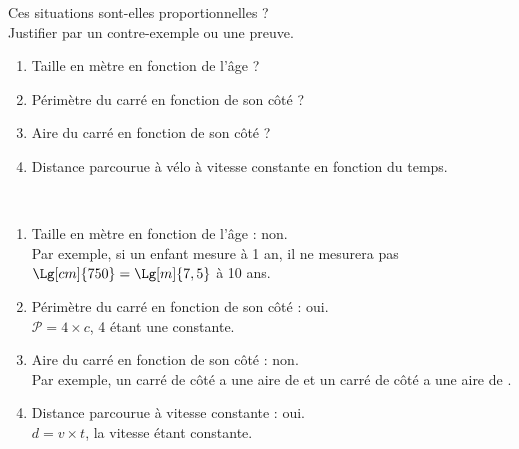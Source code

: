 \begin{exercice*} %
   Ces situations sont-elles proportionnelles ? \\
   Justifier par un contre-exemple ou une preuve.
   \begin{enumerate}
      \item Taille en mètre en fonction de l'âge ?
      \item Périmètre du carré en fonction de son côté ?
      \item Aire du carré en fonction de son côté ?
      \item Distance parcourue à vélo à vitesse constante en fonction du temps.
   \end{enumerate}
\end{exercice*}

\begin{corrige}
   \ \\ [-5mm]
   \begin{enumerate}
      \item Taille en mètre en fonction de l'âge : {\red non}. \\
         Par exemple, si un enfant mesure  à 1 an, il ne mesurera pas $\Lg[cm]{750} =\Lg[m]{7,5}$ à 10 ans.
      \item Périmètre du carré en fonction de son côté : {\red oui}. \\
         $\mathcal{P} =4\times c$, 4 étant une constante.
      \item Aire du carré en fonction de son côté  : {\red non}. \\
         Par exemple, un carré de côté  a une aire de  et un carré de côté  a une aire de .
      \item Distance parcourue à vitesse constante : {\red oui}. \\
         $d =v\times t$, la vitesse étant constante.
   \end{enumerate}
\end{corrige}
